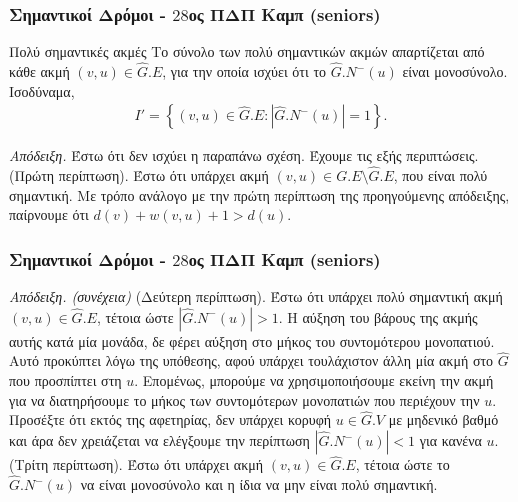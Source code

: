 \documentclass[t]{beamer}
\begin{document}
\begin{frame}
	\frametitle{Σημαντικοί Δρόμοι - $28$ος ΠΔΠ Καμπ (seniors)}
	\begin{block}{Πολύ σημαντικές ακμές}
		Το σύνολο των πολύ σημαντικών ακμών απαρτίζεται από κάθε ακμή $(v, u) \in \hat{G}.E$, για την οποία ισχύει ότι το $\hat{G}.N^-(u)$ είναι μονοσύνολο.
		Ισοδύναμα, 
		\begin{align*}
			I' = \left\{(v, u) \in \hat{G}.E : \left|\hat{G}.N^-(u)\right| = 1\right\}.	
		\end{align*}
	\end{block}	
	\pause
	\begin{block}{\emph{Απόδειξη.}}
		Έστω ότι δεν ισχύει η παραπάνω σχέση. 
		Έχουμε τις εξής περιπτώσεις.
		\pause
		\\
		\vspace{0.25cm}
		(Πρώτη περίπτωση). Έστω ότι υπάρχει ακμή $(v, u) \in G.E \setminus \hat{G}.E$, που είναι πολύ σημαντική. Με τρόπο ανάλογο με την πρώτη περίπτωση της προηγούμενης απόδειξης, 
		παίρνουμε ότι $d(v) + w(v, u) + 1 > d(u).$
	\end{block}
\end{frame}

\begin{frame}
	\frametitle{Σημαντικοί Δρόμοι - $28$ος ΠΔΠ Καμπ (seniors)}
	\begin{block}{\emph{Απόδειξη. (συνέχεια)}}
		(Δεύτερη περίπτωση). Έστω ότι υπάρχει πολύ σημαντική ακμή $(v, u) \in \hat{G}.E$, τέτοια ώστε $\left|\hat{G}.N^-(u)\right| > 1$. Η αύξηση του βάρους της ακμής αυτής 
		κατά μία μονάδα, δε φέρει αύξηση στο μήκος του συντομότερου μονοπατιού. Αυτό προκύπτει λόγω της υπόθεσης, αφού υπάρχει τουλάχιστον άλλη μία ακμή
		στο $\hat{G}$ που προσπίπτει στη $u$. Επομένως, μπορούμε να χρησιμοποιήσουμε εκείνη την ακμή για να διατηρήσουμε το μήκος των συντομότερων μονοπατιών
		που περιέχουν την $u$.
		\pause
		\\
		\vspace{0.25cm}
		Προσέξτε ότι εκτός της αφετηρίας, δεν υπάρχει κορυφή $u \in \hat{G}.V$ με μηδενικό βαθμό και άρα δεν χρειάζεται να ελέγξουμε την περίπτωση $\left|\hat{G}.N^-(u)\right| < 1$ για κανένα $u$.
		\pause
		\\
		\vspace{0.25cm}
		(Τρίτη περίπτωση). Έστω ότι υπάρχει ακμή $(v, u) \in \hat{G}.E$, τέτοια ώστε το $\hat{G}.N^-(u)$ να είναι μονοσύνολο και η ίδια να μην είναι πολύ σημαντική. 
	\end{block}
\end{frame}
\end{document}
